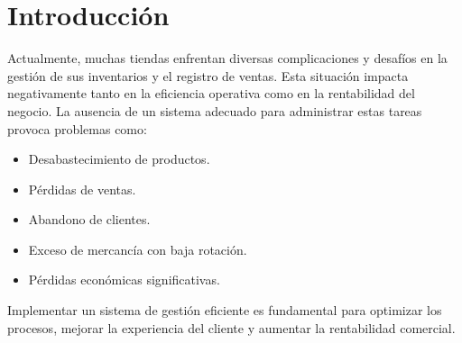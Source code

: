 \section*{\centering Introducción}

Actualmente, muchas tiendas enfrentan diversas complicaciones y desafíos 
en la gestión de sus inventarios y el registro de ventas. 
Esta situación impacta negativamente tanto en la eficiencia operativa como en la rentabilidad del negocio.
\newline
La ausencia de un sistema adecuado para administrar estas tareas provoca problemas como:
\begin{itemize}
    \item Desabastecimiento de productos.
    \item Pérdidas de ventas.
    \item Abandono de clientes.
    \item Exceso de mercancía con baja rotación.
    \item Pérdidas económicas significativas.
\end{itemize}

Implementar un sistema de gestión eficiente es fundamental para optimizar los procesos, 
mejorar la experiencia del cliente y aumentar la rentabilidad comercial.